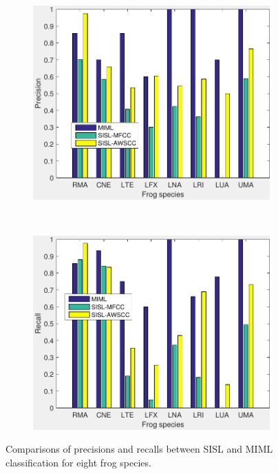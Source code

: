 \begin{figure}[htb!]
\centering
        \begin{subfigure}[b]{0.48\textwidth}
                \includegraphics[width=\textwidth]{image/Ch6/Precision_MIML_SISL_2.pdf}
        \end{subfigure}
       ~
              \begin{subfigure}[b]{0.48\textwidth}
                \includegraphics[width=\textwidth]{image/Ch6/Recall_MIML_SISL_2.pdf}                
        \end{subfigure}     
\caption[Comparisons between SISL and MIML]{Comparisons of precisions and recalls between SISL and MIML classification for eight frog species.}
        \label{fig:comparisonofSISLandMIML}
\end{figure}



